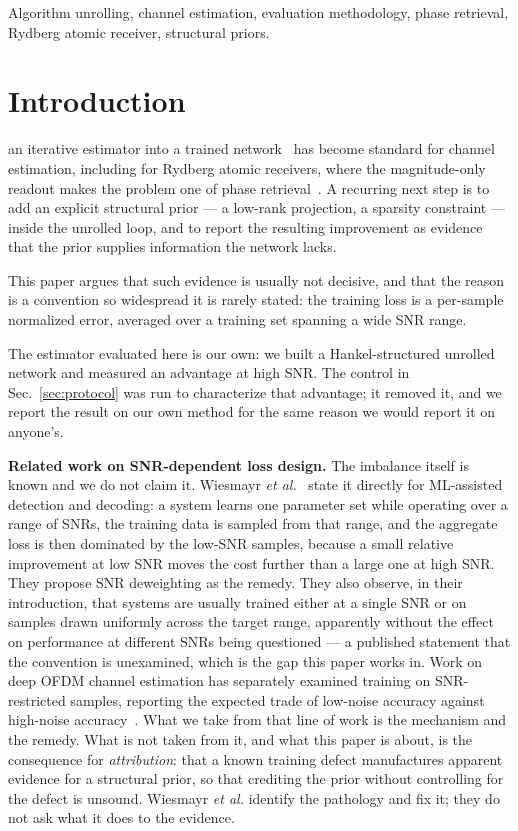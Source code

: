 \documentclass[journal]{IEEEtran}
\begin{document}
\begin{IEEEkeywords}
Algorithm unrolling, channel estimation, evaluation methodology, phase
retrieval, Rydberg atomic receiver, structural priors.
\end{IEEEkeywords}

\section{Introduction}

 an iterative estimator into a trained
network~\cite{gregor2010,monga2021} has become standard for channel estimation,
including for Rydberg atomic receivers, where the magnitude-only readout makes
the problem one of phase retrieval~\cite{xiao2026,cui2025}. A recurring next
step is to add an explicit structural prior --- a low-rank projection, a
sparsity constraint --- inside the unrolled loop, and to report the resulting
improvement as evidence that the prior supplies information the network lacks.

This paper argues that such evidence is usually not decisive, and that the
reason is a convention so widespread it is rarely stated: the training loss is
a per-sample normalized error, averaged over a training set spanning a wide
SNR range.

The estimator evaluated here is our own: we built a Hankel-structured unrolled
network and measured an advantage at high SNR. The control in
Sec.~\ref{sec:protocol} was run to characterize that advantage; it removed it,
and we report the result on our own method for the same reason we would report
it on anyone's.

\textbf{Related work on SNR-dependent loss design.} The imbalance itself is
known and we do not claim it. Wiesmayr \emph{et al.}~\cite{wiesmayr2023bler}
state it directly for ML-assisted detection and decoding: a system learns one
parameter set while operating over a range of SNRs, the training data is
sampled from that range, and the aggregate loss is then dominated by the
low-SNR samples, because a small relative improvement at low SNR moves the cost
further than a large one at high SNR. They propose SNR deweighting as the
remedy. They also observe, in their introduction, that systems are usually
trained either at a single SNR or on samples drawn uniformly across the target
range, apparently without the effect on performance at different SNRs being
questioned --- a published statement that the convention is unexamined, which
is the gap this paper works in. Work on deep OFDM channel estimation has
separately examined training on SNR-restricted samples, reporting the expected
trade of low-noise accuracy against high-noise
accuracy~\cite{jameel2024ofdm}. What we take from that line of work is the mechanism and the
remedy. What is not taken from it, and what this paper is about, is the
consequence for \emph{attribution}: that a known training defect manufactures
apparent evidence for a structural prior, so that crediting the prior without
controlling for the defect is unsound. Wiesmayr \emph{et al.} identify the
pathology and fix it; they do not ask what it does to the evidence.
\end{document}
